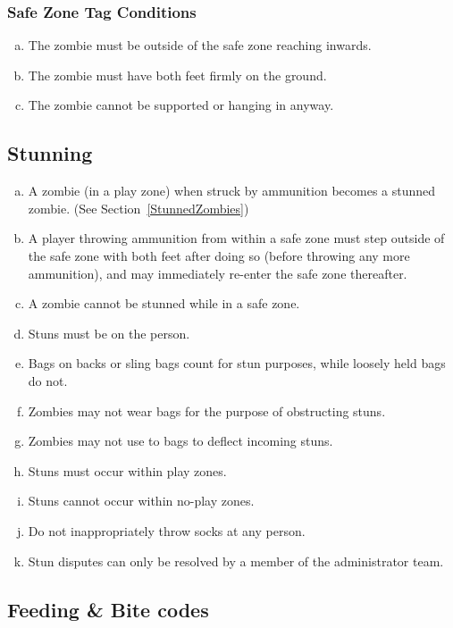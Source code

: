 \documentclass[a4paper,12pt]{article}
\begin{document}
\subsubsection{Safe Zone Tag Conditions}
\label{SafeZoneTag}
\begin{enumerate}[(a)]
    \item The zombie must be outside of the safe zone reaching inwards.
    \item The zombie must have both feet firmly on the ground.  
    \item The zombie cannot be supported or hanging in anyway.
\end{enumerate}


\subsection{Stunning}

\begin{enumerate}[(a)]
    \item A zombie (in a play zone) when struck by ammunition becomes a stunned zombie. (See Section~\ref{StunnedZombies})
    \item A player throwing ammunition from within a safe zone must step outside of the safe zone with both feet after doing so (before throwing any more ammunition), and may immediately re-enter the safe zone thereafter.
    \item A zombie cannot be stunned while in a safe zone.
    \item Stuns must be on the person.
    \item Bags on backs or sling bags count for stun purposes, while loosely held bags do not. 
    \item Zombies may not wear bags for the purpose of obstructing stuns.
    \item Zombies may not use to bags to deflect incoming stuns.
    \item Stuns must occur within play zones.
    \item Stuns cannot occur within no-play zones.
    \item Do not inappropriately throw socks at any person.
    \item Stun disputes can only be resolved by a member of the administrator team.
\end{enumerate}

\subsection{Feeding \& Bite codes}
\end{document}
